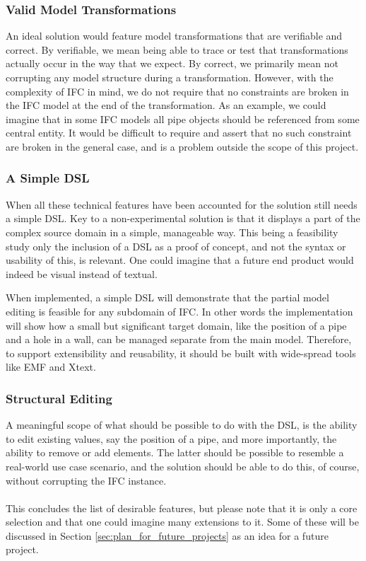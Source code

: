 \subsubsection{Valid Model Transformations}
An ideal solution would feature model transformations that are verifiable and correct. By verifiable, we mean being able to trace or test that transformations actually occur in the way that we expect. By correct, we primarily mean not corrupting any model structure during a transformation.  However, with the complexity of IFC in mind, we do not require that no constraints are broken in the IFC model at the end of the transformation. As an example, we could imagine that in some IFC models all pipe objects should be referenced from some central entity. It would be difficult to require and assert that no such constraint are broken in the general case, and is a problem outside the scope of this project.

\subsubsection{A Simple DSL}
When all these technical features have been accounted for the solution still needs a simple DSL. Key to a non-experimental solution is that it displays a part of the complex source domain in a simple, manageable way.  This being a feasibility study only the inclusion of a DSL as a proof of concept, and not the syntax or usability of this, is relevant. One could imagine that a future end product would indeed be visual instead of textual.

When implemented, a simple DSL will demonstrate that the partial model editing is feasible for any subdomain of IFC. In other words the implementation will show how a small but significant target domain, like the position of a pipe and a hole in a wall, can be managed separate from the main model. Therefore, to support extensibility and reusability, it should be built with wide-spread tools like EMF and Xtext.

\subsubsection{Structural Editing}
A meaningful scope of what should be possible to do with the DSL, is the ability to edit existing values, say the position of a pipe, and more importantly, the ability to remove or add elements. The latter should be possible to resemble a real-world use case scenario, and the solution should be able to do this, of course, without corrupting the IFC instance.
\paragraph{}
This concludes the list of desirable features, but please note that it is only a core selection and that one could imagine many extensions to it. Some of these will be discussed in Section \ref{sec:plan_for_future_projects} as an idea for a future project.

